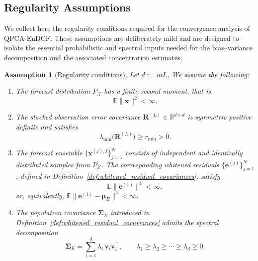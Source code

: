\documentclass[11pt,a4paper]{article}
\newtheorem{assumption}{Assumption}
\begin{document}



\subsection{Regularity Assumptions}
\label{subsec:regularity_assumptions}

We collect here the regularity conditions required for the convergence analysis of QPCA-EnDCF. These assumptions are deliberately mild and are designed to isolate the essential probabilistic and spectral inputs needed for the bias--variance decomposition and the associated concentration estimates.

\begin{assumption}[Regularity conditions]
\label{ass:regularity_bias_variance}
Let $d:=mL$. We assume the following:
\begin{enumerate}[label=(\roman*)]
\item The forecast distribution $P_{\mathcal{X}}$ has a finite second moment, that is,
\begin{equation}
\mathbb{E}\|\mathbf{x}\|^{2}<\infty .
\end{equation}

\item The stacked observation error covariance $\mathbf{R}^{(L)}\in\mathbb{R}^{d\times d}$ is symmetric positive definite and satisfies
\begin{equation}
\lambda_{\min}\!\bigl(\mathbf{R}^{(L)}\bigr)\ge r_{\min}>0.
\end{equation}

\item The forecast ensemble $\{\mathbf{x}^{(j),f}\}_{j=1}^N$ consists of independent and identically distributed samples from $P_{\mathcal{X}}$. The corresponding whitened residuals $\{\mathbf{e}^{(j)}\}_{j=1}^N$, defined in Definition~\ref{def:whitened_residual_covariances}, satisfy
\begin{equation}
\mathbb{E}\|\mathbf{e}^{(1)}\|^{4}<\infty,
\end{equation}
or, equivalently, $\mathbb{E}\|\mathbf{e}^{(1)}-\boldsymbol{\mu}_E\|^{4}<\infty$.

\item The population covariance $\boldsymbol{\Sigma}_E$ introduced in Definition~\ref{def:whitened_residual_covariances} admits the spectral decomposition
\begin{equation}
\boldsymbol{\Sigma}_E=\sum_{i=1}^{d}\lambda_i\,\mathbf{v}_i\mathbf{v}_i^\top,
\qquad
\lambda_1\ge\lambda_2\ge\cdots\ge\lambda_d\ge 0.
\end{equation}
\end{enumerate}
\end{assumption}
\end{document}
